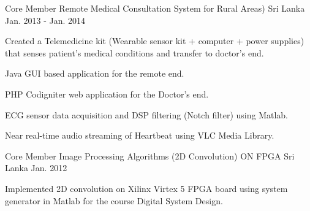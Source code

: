 


\begin{cventries}


	\cventry
		{Core Member} %
		{Remote Medical Consultation System for Rural Areas)} %
		{Sri Lanka} %
		{Jan. 2013 - Jan. 2014} %
		{ %
			\begin{cvitems}
				\item {Created a Telemedicine kit (Wearable sensor kit + computer + power supplies) that senses patient’s medical conditions and transfer to doctor’s end.}
				\item {Java GUI based application for the remote end.}
				\item {PHP Codigniter web application for the Doctor's end.}
				\item {ECG sensor data acquisition and DSP filtering (Notch filter) using Matlab.}
				\item {Near real-time audio streaming of Heartbeat using VLC Media Library.}
			\end{cvitems}
		}


\cventry
	{Core Member} %
	{Image Processing Algorithms (2D Convolution) ON FPGA} %
	{Sri Lanka} %
	{Jan. 2012} %
	{ %
		\begin{cvitems}
			\item {Implemented 2D convolution on Xilinx Virtex 5 FPGA board using system generator in Matlab for the course Digital System Design.}
		\end{cvitems}
	}


\end{cventries}
